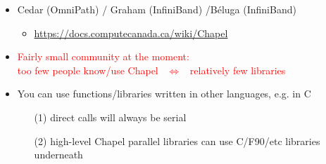 \documentclass[10pt,xcolor=pdftex,dvipsnames,table]{beamer}
\newcommand{\tc}{\textcolor}
\begin{document}

\begin{frame}{}
  \begin{itemize}\setlength{\itemsep}{5mm}
  \item Cedar (OmniPath) / Graham (InfiniBand) /Béluga (InfiniBand)
    \begin{itemize}[]\setlength{\itemsep}{1mm}
    \item \url{https://docs.computecanada.ca/wiki/Chapel}
      \startchapel
    \end{itemize}
  \item \tc{red}{Fairly small community at the moment:\\ \qquad too few people know/use Chapel
    ~$\Longleftrightarrow$~ relatively few libraries}
  \item You can use functions/libraries written in other languages, e.g. in C
    \begin{enumerate}[]\setlength{\itemsep}{1mm}
    \item[(1)] direct calls will always be serial
    \item[(2)] high-level Chapel parallel libraries can use C/F90/etc libraries underneath
    \end{enumerate}
  \end{itemize}
\end{frame}
\end{document}
